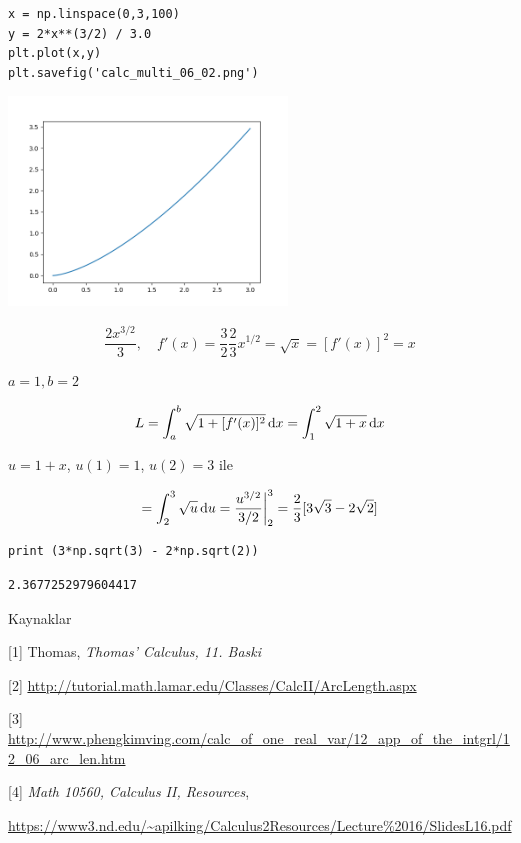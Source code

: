 \documentclass[12pt,fleqn]{article}\usepackage{../../common}
\begin{document}
\begin{verbatim}
x = np.linspace(0,3,100)
y = 2*x**(3/2) / 3.0
plt.plot(x,y)
plt.savefig('calc_multi_06_02.png')
\end{verbatim}

\includegraphics[width=20em]{calc_multi_06_02.png}

$$
 \frac{2 x ^{3/2}}{3}, \quad f'(x) = \frac{3}{2} \frac{2}{3} x^{1/2} =
 \sqrt{x} = [f'(x)]^2 = x
$$

$a=1,b=2$

$$
L = \int _{a}^{b} \sqrt{ 1+ [f'(x)]^2} \,\mathrm{d} x = 
\int _{1}^{2} \sqrt{1 + x} \,\mathrm{d} x
$$

$u = 1 + x$, $u(1) = 1$, $u(2) = 3$ ile

$$
= \int _{2}^{3} \sqrt{u} \,\mathrm{d} u = \frac{u^{3/2}}{3/2} \bigg\vert _{2}^{3} = 
\frac{2}{3} [3 \sqrt{3} - 2\sqrt{2} ]
$$


\begin{verbatim}
print (3*np.sqrt(3) - 2*np.sqrt(2))
\end{verbatim}

\begin{verbatim}
2.3677252979604417
\end{verbatim}

Kaynaklar

[1] Thomas, {\em Thomas' Calculus, 11. Baski}

[2] \url{http://tutorial.math.lamar.edu/Classes/CalcII/ArcLength.aspx}

[3] 
\url{http://www.phengkimving.com/calc_of_one_real_var/12_app_of_the_intgrl/12_06_arc_len.htm}

[4] {\em Math 10560, Calculus II, Resources}, 
    
\url{https://www3.nd.edu/~apilking/Calculus2Resources/Lecture%2016/SlidesL16.pdf}
\end{document}
